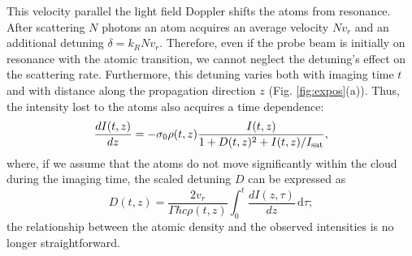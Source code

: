 \documentclass[12pt]{iopart}
\begin{document}
\par This velocity parallel the light field Doppler shifts the atoms from resonance. After scattering $N$ photons an atom acquires an average velocity $N v_r$ and an additional detuning $\delta=k_R N v_r$. Therefore, even if the probe beam is initially on resonance with the atomic transition, we cannot neglect the detuning's  effect on the scattering rate. Furthermore, this detuning varies both with imaging time $t$ and with distance along the propagation direction $z$ (Fig. \ref{fig:expos}(a)). Thus, the intensity lost to the atoms also acquires a time dependence:
\begin{equation}
\frac{dI(t,z)}{dz}=-\sigma_0 \rho(t,z) \frac{I(t,z)}{1+D(t,z)^2 +I(t,z)/I_{\rm{sat}}}, \label{eq3}
\end{equation}
where, if we assume that the atoms do not move significantly within the cloud during the imaging time, the scaled detuning $D$ can be expressed as
\begin{equation}
D(t,z)=\frac{2 v_r}{\Gamma\hbar c \rho(t,z)}\int_0^t \frac{dI(z,\tau)}{dz}\,\mathrm{d}\tau; \label{eq4}
\end{equation}
the relationship between the atomic density and the observed intensities is no longer straightforward.
\end{document}
